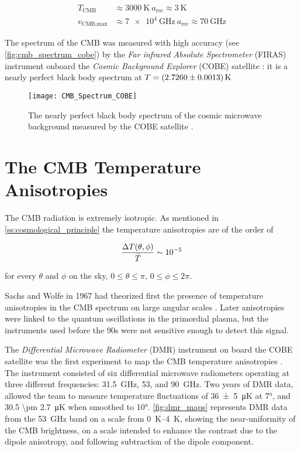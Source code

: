 \begin{align}
        T_{\text{CMB}} & \approx \SI{3000}{\kelvin}\ a_{\text{rec}} \approx
        \SI{3}{\kelvin} \\
        v_{\text{CMB,max}} & \approx \SI{7e4}{\giga\hertz}\ a_{\text{rec}}
        \approx \SI{70}{\giga\hertz}
\end{align}

The spectrum of the CMB was measured with high accuracy (see
\autoref{fig:cmb_spectrum_cobe}) by the \emph{Far infrared Absolute
Spectrometer} (FIRAS) instrument onboard the \emph{Cosmic Background
Explorer} (COBE) satellite \autocite{mather1994measurement}: it is a nearly
perfect black body spectrum at $T = \SI{2.7260 \pm 0.0013}{\kelvin}$

\begin{figure}
        \centering
        \texttt{[image: CMB\_Spectrum\_COBE]}
        \caption{The nearly perfect black body spectrum of the cosmic
        microwave background measured by the COBE satellite
        \autocite{Lambda}.}
        \label{fig:cmb_spectrum_cobe}
\end{figure}

\section{The CMB Temperature Anisotropies}

The CMB radiation is extremely isotropic. As mentioned in
\autoref{ss:cosmological_principle} the temperature anisotropies are of the
order of

\begin{equation}
\frac{\Delta T\qty(\theta,\phi)}{\bar T} \sim \num{e-5}
\end{equation}

for every $\theta$ and $\phi$ on the sky, $0 \leq \theta \leq \pi$,
$0 \leq \phi \leq 2\pi$.

Sachs and Wolfe in 1967 had theorized first the presence of temperature
anisotropies in the CMB spectrum on large angular scales
\autocite{sachs1967perturbations}. Later anisotropies were linked to the
quantum oscillations in the primordial plasma, but the instruments used before
the 90s were not sensitive enough to detect this signal. 

The \emph{Differential Microwave Radiometer} (DMR) instrument on board the
COBE satellite was the first experiment to map the CMB temperature
anisotropies \autocite{bennett1996four}. The instrument consisted of six
differential microwave radiometers operating at three different
frequencies: \SI{ 31.5}{\giga\hertz}, \num{53}, and \SI{90}{\giga\hertz}.
Two years of DMR data, allowed the team to measure temperature fluctuations
of \SI{36 \pm 5}{\micro\kelvin} at \ang{7}, and \SI{30.5 \pm
2.7}{\micro\kelvin} when smoothed to \ang{10}.  \autoref{fig:dmr_maps}
represents DMR data from the \SI{53}{\giga\hertz} band on a scale from
\SIrange{0}{4}{\kelvin}, showing the near-uniformity of the CMB brightness,
on a scale intended to enhance the contrast due to the dipole anisotropy,
and following subtraction of the dipole component.

